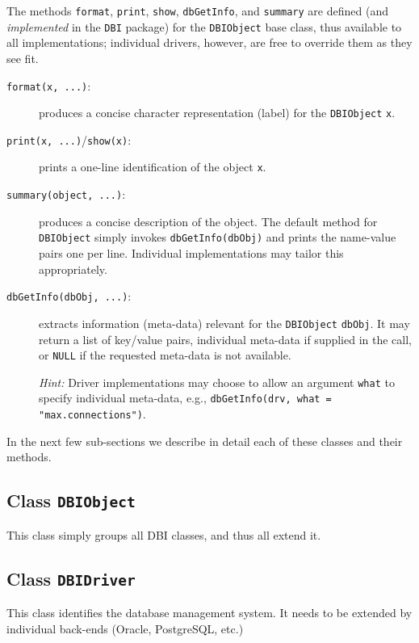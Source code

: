 \documentclass{article}
\newcommand{\sobj}[1]{\mbox{\tt #1}}    %
\newcommand{\sexp}[1]{\mbox{\tt #1}}    %
\newcommand{\sclass}[1]{\mbox{\tt #1}}  %
\newcommand{\smethod}[1]{\mbox{\tt #1}} %
\begin{document}
The methods \smethod{format}, \smethod{print}, \smethod{show}, 
\smethod{dbGetInfo}, and \smethod{summary}
are defined (and \emph{implemented} in the \sobj{DBI} package) 
for the \sclass{DBIObject} base class, thus available to all 
implementations; individual drivers, however, are free to override 
them as they see fit.
\begin{description} 
\item[\smethod{format(x, ...)}:]
   produces a concise character representation (label) for the
   \sclass{DBIObject} \sobj{x}.

\item[\smethod{print(x, ...)}/\smethod{show(x)}:]
  prints a one-line identification of the object \sobj{x}.

\item[\smethod{summary(object, ...)}:]
  produces a concise description of the object.
  The default method for \sclass{DBIObject} simply 
  invokes \sexp{dbGetInfo(dbObj)} and prints the name-value
  pairs one per line.  Individual implementations may tailor
  this appropriately.

\item[\smethod{dbGetInfo(dbObj, ...)}:]
  extracts information (meta-data) relevant for the
  \sclass{DBIObject} \sobj{dbObj}.  It may return a list
  of key/value pairs, individual meta-data if supplied
  in the call, or \sobj{NULL} if the requested meta-data
  is not available.

  \emph{Hint:} Driver implementations may choose to allow an 
  argument \sobj{what} to specify individual meta-data,  e.g., 
  \sexp{dbGetInfo(drv, what = "max.connections")}.

\end{description}

In the next few sub-sections we describe in detail each of these
classes and their methods.

\subsection{Class \sclass{DBIObject}}\label{sec:DBIObject}
This class simply groups all DBI classes, and thus all extend it.

\subsection{Class \sclass{DBIDriver}}\label{sec:DBIDriver}
This class identifies the database management system. It needs to 
be extended by individual back-ends (Oracle, PostgreSQL, etc.)
\end{document}
